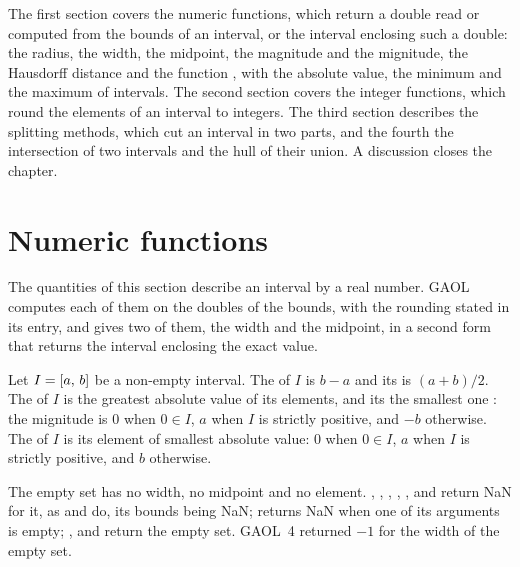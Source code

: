 \documentclass[12pt,a4paper,twoside,openright]{book}
\begin{document}
\medskip
The first section covers the numeric functions, which return a double read
or computed from the bounds of an interval, or the interval enclosing such a
double: the radius, the width, the midpoint, the magnitude and the
mignitude, the Hausdorff distance and the function , with the
absolute value, the minimum and the maximum of intervals. The second section
covers the integer functions, which round the elements of an interval to
integers. The third section describes the splitting methods, which cut an
interval in two parts, and the fourth the intersection of two intervals and
the hull of their union. A discussion closes the chapter.

\section{Numeric functions}\label{sec:functions-numeric}
%
%
%

The quantities of this section describe an interval by a real number. GAOL
computes each of them on the doubles of the bounds, with the rounding stated
in its entry, and gives two of them, the width and the midpoint, in a second
form that returns the interval enclosing the exact value.

\begin{Def}\label{def:functions-numeric}
Let $I=[a,\,b]$ be a non-empty interval. The  of $I$ is $b-a$
and its  is $(a+b)/2$. The  of $I$ is the
greatest absolute value of its elements, and its  the
smallest one \cite[chap.~3]{Hansen:book92}: the mignitude is $0$ when
$0\in I$, $a$ when $I$ is strictly positive, and $-b$ otherwise. The
 of $I$ \cite[def.~1.3.28]{Stahl:PhD} is its element
of smallest absolute value: $0$ when $0\in I$, $a$ when $I$ is strictly
positive, and $b$ otherwise.
\end{Def}

\begin{Rem}\label{rem:functions-empty}
The empty set has no width, no midpoint and no element. ,
, , , ,
 and  return NaN for it, as  and
 do, its bounds being NaN;  returns NaN
when one of its arguments is empty; ,
 and  return the empty set. GAOL~4 returned
$-1$ for the width of the empty set.\newinvfive
\end{Rem}
\end{document}
